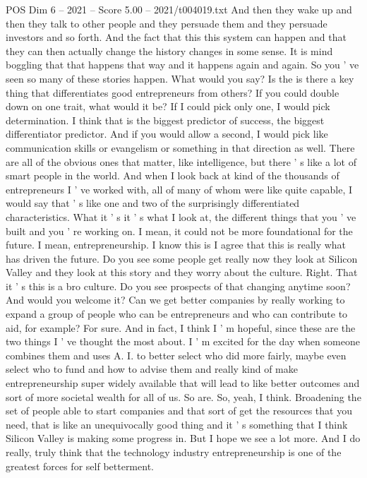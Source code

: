\begin{textsample}{POS Dim 6 – 2021 – Score 5.00 – 2021/t004019.txt}
And then they wake up and then they talk to other people and they persuade them and they persuade investors and so forth.
And the fact that this this system can happen and that they can then actually change the history changes in some sense.
It is mind boggling that that happens that way and it happens again and again.
So you ' ve seen so many of these stories happen.
What would you say?
Is the is there a key thing that differentiates good entrepreneurs from others?
If you could double down on one trait, what would it be?
If I could pick only one, I would pick determination.
I think that is the biggest predictor of success, the biggest differentiator predictor.
And if you would allow a second, I would pick like communication skills or evangelism or something in that direction as well.
There are all of the obvious ones that matter, like intelligence, but there ' s like a lot of smart people in the world.
And when I look back at kind of the thousands of entrepreneurs I ' ve worked with, all of many of whom were like quite capable, I would say that ' s like one and two of the surprisingly differentiated characteristics.
What it ' s it ' s what I look at, the different things that you ' ve built and you ' re working on.
I mean, it could not be more foundational for the future.
I mean, entrepreneurship.
I know this is I agree that this is really what has driven the future.
Do you see some people get really now they look at Silicon Valley and they look at this story and they worry about the culture.
Right.
That it ' s this is a bro culture.
Do you see prospects of that changing anytime soon?
And would you welcome it?
Can we get better companies by really working to expand a group of people who can be entrepreneurs and who can contribute to aid, for example?
For sure.
And in fact, I think I ' m hopeful, since these are the two things I ' ve thought the most about.
I ' m excited for the day when someone combines them and uses A.
I. to better select who did more fairly, maybe even select who to fund and how to advise them and really kind of make entrepreneurship super widely available that will lead to like better outcomes and sort of more societal wealth for all of us.
So are.
So, yeah, I think.
Broadening the set of people able to start companies and that sort of get the resources that you need, that is like an unequivocally good thing and it ' s something that I think Silicon Valley is making some progress in.
But I hope we see a lot more.
And I do really, truly think that the technology industry entrepreneurship is one of the greatest forces for self betterment.

\end{textsample}
